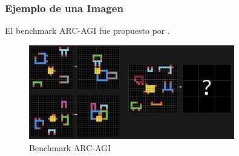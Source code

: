 \begin{frame}
    \frametitle{Ejemplo de una Imagen}

    El benchmark ARC-AGI fue propuesto por \cite{Cho19}.

    \vspace{0.3cm}
    \begin{figure}
        \centering
        \includegraphics[width=0.8\textwidth]{images/arc-agi}
        \vspace{0.2cm}
        \caption{Benchmark ARC-AGI}
        \label{fig:arc-agi}
    \end{figure}

\end{frame}

